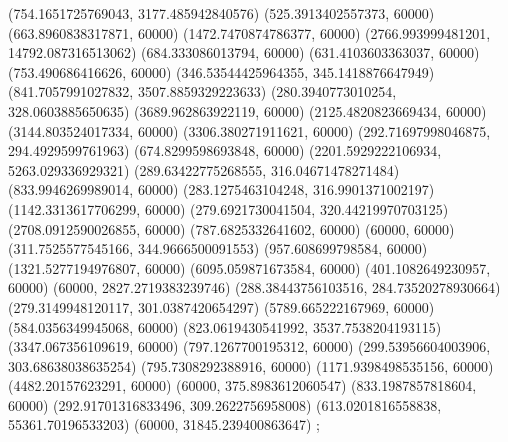 {(754.1651725769043, 3177.485942840576) %
(525.3913402557373, 60000) %
(663.8960838317871, 60000) %
(1472.7470874786377, 60000) %
(2766.993999481201, 14792.087316513062) %
(684.333086013794, 60000) %
(631.4103603363037, 60000) %
(753.490686416626, 60000) %
(346.53544425964355, 345.1418876647949) %
(841.7057991027832, 3507.8859329223633) %
(280.3940773010254, 328.0603885650635) %
(3689.962863922119, 60000) %
(2125.4820823669434, 60000) %
(3144.803524017334, 60000) %
(3306.380271911621, 60000) %
(292.71697998046875, 294.4929599761963) %
(674.8299598693848, 60000) %
(2201.5929222106934, 5263.029336929321) %
(289.63422775268555, 316.04671478271484) %
(833.9946269989014, 60000) %
(283.1275463104248, 316.9901371002197) %
(1142.3313617706299, 60000) %
(279.6921730041504, 320.44219970703125) %
(2708.0912590026855, 60000) %
(787.6825332641602, 60000) %
(60000, 60000) %
(311.7525577545166, 344.9666500091553) %
(957.608699798584, 60000) %
(1321.5277194976807, 60000) %
(6095.059871673584, 60000) %
(401.1082649230957, 60000) %
(60000, 2827.2719383239746) %
(288.38443756103516, 284.73520278930664) %
(279.3149948120117, 301.0387420654297) %
(5789.665222167969, 60000) %
(584.0356349945068, 60000) %
(823.0619430541992, 3537.7538204193115) %
(3347.067356109619, 60000) %
(797.1267700195312, 60000) %
(299.53956604003906, 303.68638038635254) %
(795.7308292388916, 60000) %
(1171.9398498535156, 60000) %
(4482.20157623291, 60000) %
(60000, 375.8983612060547) %
(833.1987857818604, 60000) %
(292.91701316833496, 309.2622756958008) %
(613.0201816558838, 55361.70196533203) %
(60000, 31845.239400863647) %
};